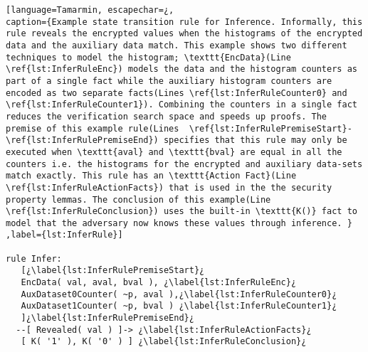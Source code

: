 \begin{lstlisting}[language=Tamarmin, escapechar=¿, 
caption={Example state transition rule for Inference. Informally, this rule reveals the encrypted values when the histograms of the encrypted data and the auxiliary data match. This example shows two different techniques to model the histogram; \texttt{EncData}(Line \ref{lst:InferRuleEnc}) models the data and the histogram counters as part of a single fact while the auxiliary histogram counters are encoded as two separate facts(Lines \ref{lst:InferRuleCounter0} and \ref{lst:InferRuleCounter1}). Combining the counters in a single fact reduces the verification search space and speeds up proofs. The premise of this example rule(Lines  \ref{lst:InferRulePremiseStart}-\ref{lst:InferRulePremiseEnd}) specifies that this rule may only be executed when \texttt{aval} and \texttt{bval} are equal in all the counters i.e. the histograms for the encrypted and auxiliary data-sets match exactly. This rule has an \texttt{Action Fact}(Line \ref{lst:InferRuleActionFacts}) that is used in the the security property lemmas. The conclusion of this example(Line \ref{lst:InferRuleConclusion}) uses the built-in \texttt{K()} fact to model that the adversary now knows these values through inference. } ,label={lst:InferRule}]

rule Infer:
   [¿\label{lst:InferRulePremiseStart}¿
   EncData( val, aval, bval ), ¿\label{lst:InferRuleEnc}¿
   AuxDataset0Counter( ~p, aval ),¿\label{lst:InferRuleCounter0}¿
   AuxDataset1Counter( ~p, bval ) ¿\label{lst:InferRuleCounter1}¿
   ]¿\label{lst:InferRulePremiseEnd}¿ 
  --[ Revealed( val ) ]-> ¿\label{lst:InferRuleActionFacts}¿
   [ K( '1' ), K( '0' ) ] ¿\label{lst:InferRuleConclusion}¿

\end{lstlisting}

